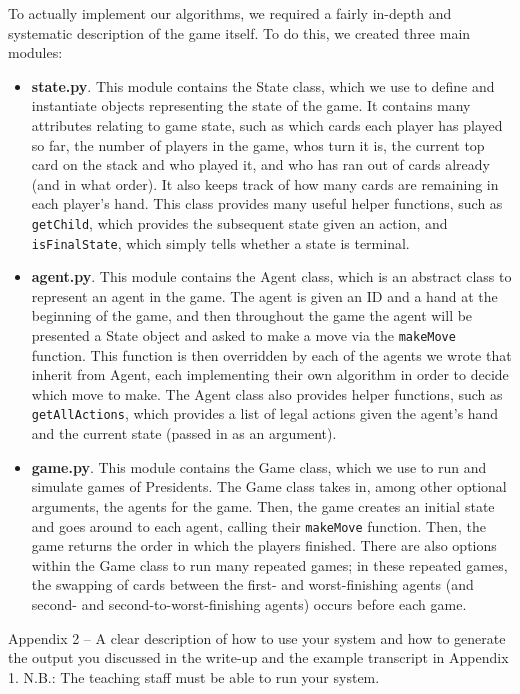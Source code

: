 \documentclass[11pt]{article}
\begin{document}
To actually implement our algorithms, we required a fairly in-depth and systematic description of the game itself. To do this, we created three main modules:
\begin{itemize}
  \item \textbf{state.py}. This module contains the State class, which we use to define and instantiate objects representing the state of the game. It contains many attributes relating to game state, such as which cards each player has played so far, the number of players in the game, whos turn it is, the current top card on the stack and who played it, and who has ran out of cards already (and in what order). It also keeps track of how many cards are remaining in each player's hand. This class provides many useful helper functions, such as \verb|getChild|, which provides the subsequent state given an action, and \verb|isFinalState|, which simply tells whether a state is terminal.
  \item \textbf{agent.py}. This module contains the Agent class, which is an abstract class to represent an agent in the game. The agent is given an ID and a hand at the beginning of the game, and then throughout the game the agent will be presented a State object and asked to make a move via the \verb|makeMove| function. This function is then overridden by each of the agents we wrote that inherit from Agent, each implementing their own algorithm in order to decide which move to make. The Agent class also provides helper functions, such as \verb|getAllActions|, which provides a list of legal actions given the agent's hand and the current state (passed in as an argument).
  \item \textbf{game.py}. This module contains the Game class, which we use to run and simulate games of Presidents. The Game class takes in, among other optional arguments, the agents for the game. Then, the game creates an initial state and goes around to each agent, calling their \verb|makeMove| function. Then, the game returns the order in which the players finished. There are also options within the Game class to run many repeated games; in these repeated games, the swapping of cards between the first- and worst-finishing agents (and second- and second-to-worst-finishing agents) occurs before each game.
\end{itemize}

 Appendix 2 – A clear description of how to use your system and how to generate the output you discussed in the write-up and the example transcript in Appendix 1. N.B.: The teaching staff must be able to run your system.
\end{document}
